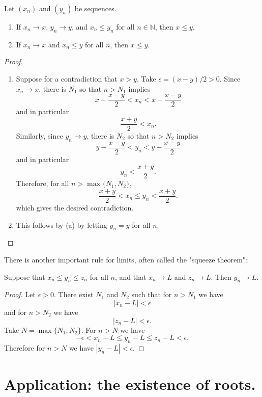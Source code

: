 \documentclass[11pt,dvipsnames]{book}
\numberwithin{equation}{section} %
\numberwithin{figure}{section} %
\numberwithin{table}{section} %
\begin{document}
\begin{proposition}
\label{p:x_n<y_n}
Let $(x_{n})$ and $(y_{n})$ be sequences.
\begin{enumerate}[label=(\alph*)]
\item  If $x_{n}\rightarrow x$, $y_{n}\rightarrow y$, and $x_{n}\leq y_{n}$ for all $n\in\mathbb{N}$, then $x\leq y$. 
\item If $x_n\rightarrow x$ and $x_{n}\leq y$ for all $n$, then $x\leq y$. 
\end{enumerate}
\end{proposition}


\begin{proof}
\begin{enumerate}[label=(\alph*)]
\item  Suppose for a contradiction that $x>y$. Take $\epsilon = (x-y)/2 > 0$. Since $x_{n}\rightarrow x$, there is $N_{1}$ so that $n > N_{1}$ implies 
\[
x-\frac{x-y}{2}<x_{n}<x+\frac{x-y}{2}
\]
and in particular
\[
\frac{x+y}{2}<x_{n}.
\]
Similarly, since $y_{n}\rightarrow y$, there is $N_{2}$ so that $n > N_{2}$ implies 
\[
y-\frac{x-y}{2}<y_{n}<y+\frac{x-y}{2}
\]
and in particular
\[
y_{n}<\frac{x+y}{2}.
\]
Therefore, for all $n>  \max\{N_{1},N_{2}\}$,
\[
\frac{x+y}{2}<x_{n} \leq y_n < \frac{x+y}{2}.
\]
which gives the desired contradiction.

\item This follows by (a) by letting $y_{n}=y$ for all $n$.
\end{enumerate}
\end{proof}

There is another important rule for limits, often called the "squeeze theorem":

\begin{proposition}\label{squeeze}
Suppose that $x_n \leq y_n \leq z_n$ for all $n$, and that $x_n \to L$ and $z_n \to L$. Then $y_n \to L$.
\end{proposition}

\begin{proof}
Let $\epsilon > 0$. There exist $N_1$ and $N_2$ such that for $n > N_1$ we have
\[ |x_n - L| < \epsilon\]
and for $n > N_2$ we have
\[ |z_n - L| < \epsilon.\]
Take $N = \max\{N_1, N_2\}$. For $n > N$ we have 
\[ - \epsilon < x_n - L \leq y_n - L \leq z_n - L < \epsilon.\]
Therefore for $n > N$ we have $|y_n - L| < \epsilon$.
\end{proof}


\section{Application: the existence of roots.}
\end{document}
